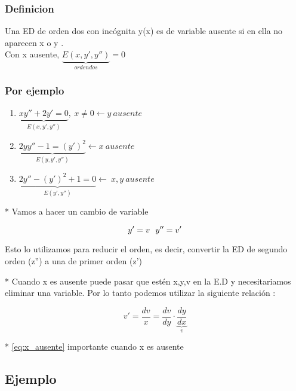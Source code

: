 \documentclass{article}
\begin{document}
\subsubsection{Definicion}

Una ED de orden dos con incógnita y(x) es de variable ausente si en ella no aparecen x o y . \\

Con  x ausente,  $\underbrace{E \left( x,y',y'' \right)}_{orden dos} = 0 $

\subsubsection{ Por ejemplo}

\begin{enumerate}
\item $ \underbrace{xy'' + 2y' = 0}_{E \left( x, y' ,y'' \right) },  \ x \neq 0 \leftarrow y \  ausente $ 
\item $ \underbrace{2yy'' - 1 = (y')^2}_{E \left( y, y', y'' \right) } \leftarrow x \ ausente $
\item $ \underbrace{2y'' - (y')^2 +1 = 0}_{E \left( y' , y'' \right)} \leftarrow \ x,y \ ausente$
\end{enumerate}



* Vamos a hacer un cambio de variable 

\begin{equation}
\centering
\nonumber y' = v \ \  y'' =v'
\end{equation}

Esto lo utilizamos para reducir el orden, es decir, convertir la ED de segundo orden  (z'') a una de primer orden (z')


* Cuando x es ausente puede pasar que estén  x,y,v en la E.D y necesitariamos eliminar una variable.
Por lo tanto podemos utilizar la siguiente relación :

\begin{equation}
v' = \frac{dv}{x} = \frac{dv}{dy} \cdot \underbrace{ \frac{dy}{dx} }_{v} \label{eq:x_ausente}
\end{equation}

*  \ref{eq:x_ausente} importante cuando x es ausente


\subsection{Ejemplo}
\end{document}
